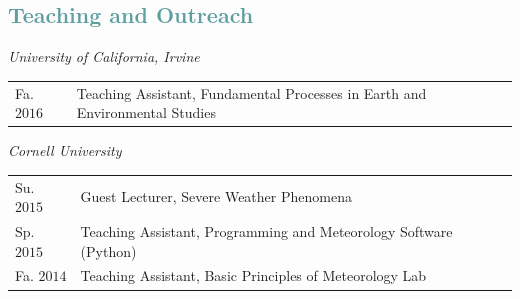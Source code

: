 \documentclass[margin,line,palatino,courier,10pt]{res}
\begin{document}
\begin{resume}

\vspace{-0.1in}
\noindent\makebox[\linewidth][r]{\rule{\textwidth}{5pt}}
\vspace{-0.3in}

\section{\sc \textcolor{CadetBlue}{\large{Teaching and Outreach}}}

\textit{University of California, Irvine}
\vspace*{0.05in}\\
\begin{tabular}{@{}p{0.8in}p{4in}}
Fa. $2016$ & Teaching Assistant, Fundamental Processes in Earth and Environmental Studies\\
\end{tabular}

\textit{Cornell University}
\vspace*{0.05in}\\
\begin{tabular}{@{}p{0.8in}p{4in}}
Su. $2015$ & Guest Lecturer, Severe Weather Phenomena\\
Sp. $2015$ & Teaching Assistant, Programming and Meteorology Software (Python)\\
Fa. $2014$ & Teaching Assistant, Basic Principles of Meteorology Lab\\
\end{tabular}


\end{resume}
\end{document}

